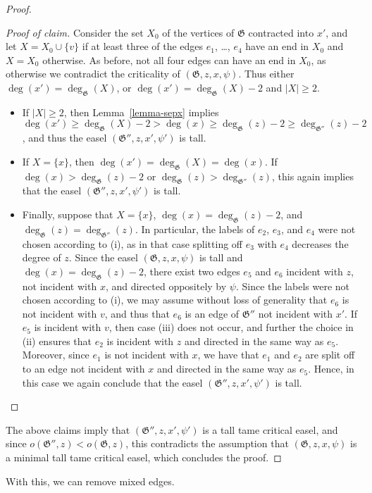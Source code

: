 \documentclass{article}
\newcommand\g{\mathfrak{G}}
\newenvironment{subproof}{%
  \renewcommand{\qedsymbol}{$\blacksquare$}%
  \begin{proof}[Proof of claim]%
}{%
  \end{proof}%
}
\begin{document}
\begin{proof}
\begin{subproof}
Consider the set $X_0$ of the vertices of $\g$ contracted into $x'$, and let $X=X_0\cup\{v\}$ if at
least three of the edges $e_1$, \ldots, $e_4$ have an end in $X_0$ and $X=X_0$ otherwise. As before, not all four edges can have an end in $X_{0}$, as otherwise we contradict the criticality of $(\g,z,x,\psi)$.
Thus either $\deg(x')=\deg_{\g}(X)$, or $\deg(x')=\deg_{\g}(X)-2$ and $|X|\ge 2$.
\begin{itemize}
\item If $|X|\ge 2$, then Lemma~\ref{lemma-sepx} implies
$\deg(x') \ge \deg_{\g}(X)-2>\deg(x)\ge \deg_{\g}(z)-2\ge \deg_{\g''}(z)-2$, and thus the easel $(\g'',z,x',\psi')$ is tall.
\item If $X=\{x\}$, then $\deg(x')=\deg_{\g}(X)=\deg(x)$.  If $\deg(x)>\deg_{\g}(z)-2$ or $\deg_{\g}(z)>\deg_{\g''}(z)$,
this again implies that the easel $(\g'',z,x',\psi')$ is tall.
\item Finally, suppose that $X=\{x\}$, $\deg(x)=\deg_{\g}(z)-2$, and $\deg_{\g} (z)=\deg_{\g''}(z)$.
In particular, the labels of $e_2$, $e_3$, and $e_4$ were not chosen according to (i),
as in that case splitting off $e_3$ with $e_4$ decreases the degree of $z$.
Since the easel $(\g,z,x,\psi)$ is tall and $\deg(x)=\deg_{\g}(z)-2$, there exist two edges $e_5$ and $e_6$ incident with $z$, not
incident with $x$, and directed oppositely by $\psi$.  Since the labels were not chosen according to (i), we may assume without loss of generality that $e_6$ is not incident with $v$, and thus that $e_6$ is an edge of $\g''$ not incident with $x'$.
If $e_5$ is incident with $v$, then case (iii) does not occur, and further the choice in (ii) ensures that $e_2$ is incident with $z$ and directed in the same way as $e_5$. Moreover,
since $e_1$ is not incident with $x$, we have that $e_1$ and $e_2$ are split off to an edge not incident with $x$ and directed in the
same way as $e_5$. Hence, in this case we again conclude that the easel $(\g'',z,x',\psi')$ is tall.
\end{itemize}
\end{subproof}

The above claims imply that $(\g'',z,x',\psi')$ is a tall tame critical easel, and since $o(\g'',z)<o(\g,z)$, this contradicts the assumption that $(\g,z,x,\psi)$ is a minimal tall tame critical easel,  which concludes the proof.
\end{proof}

With this, we can remove mixed edges.
\end{document}
